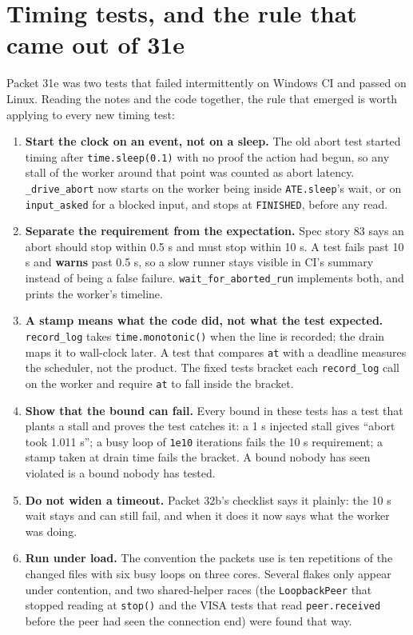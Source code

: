 \section{Timing tests, and the rule that came out of 31e}

Packet 31e was two tests that failed intermittently on Windows CI and passed on Linux. Reading the notes
and the code together, the rule that emerged is worth applying to every new timing test:

\begin{enumerate}
  \item \textbf{Start the clock on an event, not on a sleep.} The old abort test started timing after
    \texttt{time.sleep(0.1)} with no proof the action had begun, so any stall of the worker around that
    point was counted as abort latency. \texttt{\_drive\_abort} now starts on the worker being inside
    \texttt{ATE.sleep}'s wait, or on \texttt{input\_asked} for a blocked input, and stops at
    \texttt{FINISHED}, before any read.
  \item \textbf{Separate the requirement from the expectation.} Spec story 83 says an abort should stop within
    0.5 s and must stop within 10 s. A test fails past 10 s and \textbf{warns} past 0.5 s, so a slow
    runner stays visible in CI's summary instead of being a false failure.
    \texttt{wait\_\allowbreak{}for\_\allowbreak{}aborted\_\allowbreak{}run} implements both, and prints the worker's timeline.
  \item \textbf{A stamp means what the code did, not what the test expected.} \texttt{record\_log} takes
    \texttt{time.monotonic()} when the line is recorded; the drain maps it to wall-clock later. A test
    that compares \texttt{at} with a deadline measures the scheduler, not the product. The fixed tests
    bracket each \texttt{record\_log} call on the worker and require \texttt{at} to fall inside the
    bracket.
  \item \textbf{Show that the bound can fail.} Every bound in these tests has a test that plants a stall
    and proves the test catches it: a 1 s injected stall gives ``abort took 1.011 s''; a busy loop of
    \texttt{1e10} iterations fails the 10 s requirement; a stamp taken at drain time fails the bracket.
    A bound nobody has seen violated is a bound nobody has tested.
  \item \textbf{Do not widen a timeout.} Packet 32b's checklist says it plainly: the 10 s wait stays and
    can still fail, and when it does it now says what the worker was doing.
  \item \textbf{Run under load.} The convention the packets use is ten repetitions of the changed files
    with six busy loops on three cores. Several flakes only appear under contention, and two shared-helper
    races (the \texttt{LoopbackPeer} that stopped reading at \texttt{stop()} and the VISA tests that read
    \texttt{peer.received} before the peer had seen the connection end) were found that way.
\end{enumerate}

